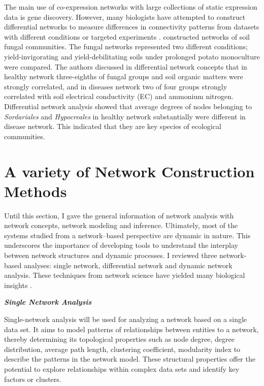 The main use of co-expression networks with large collections of static expression data is gene discovery. However, many biologists have attempted to construct differential networks to measure differences in connectivity patterns from datasets with different conditions or targeted experiments \citep{Toubiana:2013cv}. \citet{Lu:2013hga} constructed networks of soil fungal communities. The fungal networks represented two different conditions; yield-invigorating and yield-debilitating soils under prolonged potato monoculture were compared. The authors discussed in differential network concepts that in healthy network three-eighths of fungal groups and soil organic matters were strongly correlated, and in diseases network two of four groups strongly correlated with soil electrical conductivity (EC) and ammonium nitrogen. Differential network analysis showed that average degrees of nodes belonging to \textit{Sordariales} and \textit{Hypocreales} in healthy network substantially were different in disease network. This indicated that they are key species of ecological communities.

\section*{A variety of Network Construction Methods}

Until this section, I gave the general information of network analysis with network concepts, network modeling and inference. Ultimately, most of the systems studied from a network--based perspective are dynamic in nature. This underscores the importance of developing tools to understand the interplay between network structures and dynamic processes. I reviewed three network-based analyses: single network, differential network and dynamic network analysis. These techniques from network science have yielded many biological insights \citep{Idekerdiffnet}.

\textbf{\textit{Single Network Analysis}}

Single-network analysis will be used for analyzing a network based on a single data set. It aims to model patterns of relationships between entities to a network, thereby determining its topological properties such as node degree, degree distribution, average path length, clustering coefficient, modularity index \citep{newman2006modularity} to describe the patterns in the network model. These structural properties offer the potential to explore relationships within complex data sets and identify key factors or clusters.

